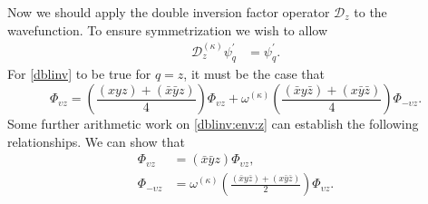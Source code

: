 Now we should apply the double inversion factor operator $\mathcal{D}_{z}$ to
the wavefunction. To ensure symmetrization we wish to allow
\begin{align}
  \mathcal{D}_{z}^{\left(\kappa\right)}\psi_{q}^{\prime}
  &=
  \psi_{q}^{\prime}
  .
\label{dblinv}
\end{align}
For \eqref{dblinv} to be true for $q = z$, it must be the case that
\begin{equation}
  \Phi_{\upsilon z}
  =
  \left(\frac{\left(xyz\right)+\left(\bar{x}\bar{y}z\right)}{4}\right)
  \Phi_{\upsilon z}
  +
  \omega^{\left(\kappa\right)}
  \left(
    \frac
    { \left(\bar{x}y\bar{z}\right)+\left(x\bar{y}\bar{z}\right) }
    {4}
  \right)
  \Phi_{-\upsilon z}
  .
\label{dblinv:env:z}
\end{equation}
Some further arithmetic work on \eqref{dblinv:env:z} can establish the following
relationships. We can show that
\begin{align}
  \Phi_{\upsilon z}
  & =
  \left(\bar{x}\bar{y}z\right)
  \Phi_{\upsilon z}
  ,
\label{dblinv:z:para}
\\
  \Phi_{-\upsilon z}
  & =
  \omega^{\left(\kappa\right)}
  \left(
    \frac{\left(\bar{x}y\bar{z}\right)+\left(x\bar{y}\bar{z}\right)}{2}
  \right)
  \Phi_{\upsilon z}
  .
\label{dblinv:z:anti}
\end{align}

